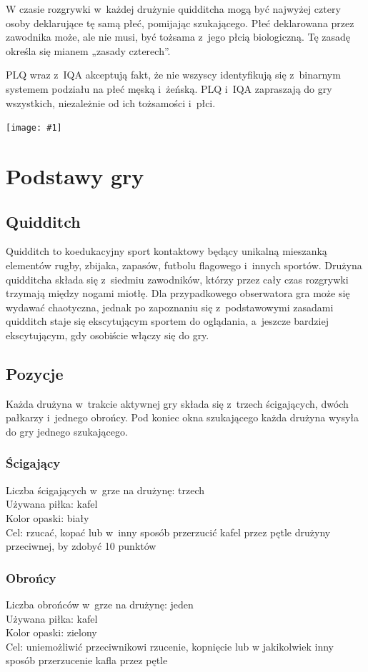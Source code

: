 \documentclass[12pt,a4paper]{article}
\newcommand\image[2]{
	\newgeometry{left=0cm,top=#2}
	\texttt{[image: \#1]}
	\restoregeometry
}
\begin{document}
W czasie rozgrywki w~każdej drużynie quidditcha mogą być najwyżej cztery
osoby deklarujące tę samą płeć, pomijając szukającego. Płeć deklarowana
przez zawodnika może, ale nie musi, być tożsama z~jego płcią
biologiczną. Tę zasadę określa się mianem „zasady czterech''.

PLQ wraz z~IQA akceptują fakt, że nie wszyscy identyfikują się z~binarnym systemem podziału na płeć męską i~żeńską. PLQ i~IQA zapraszają
do gry wszystkich, niezależnie od ich tożsamości i~płci.

\image{team_poland}{6cm}

\pagebreak
\section{Podstawy gry}

\subsection{Quidditch}

Quidditch to koedukacyjny sport kontaktowy będący unikalną mieszanką
elementów rugby, zbijaka, zapasów, futbolu flagowego i~innych sportów.
Drużyna quidditcha składa się z~siedmiu zawodników, którzy przez cały
czas rozgrywki trzymają między nogami miotłę. Dla przypadkowego
obserwatora gra może się wydawać chaotyczna, jednak po zapoznaniu się z~podstawowymi zasadami quidditch staje się ekscytującym sportem do
oglądania, a~jeszcze bardziej ekscytującym, gdy osobiście włączy się do
gry.

\subsection{Pozycje}
Każda drużyna w~trakcie aktywnej gry składa się z~trzech ścigających,
dwóch pałkarzy i~jednego obrońcy. Pod koniec okna szukającego każda
drużyna wysyła do gry jednego szukającego.

\subsubsection{Ścigający}
Liczba ścigających w~grze na drużynę: trzech \\
Używana piłka: kafel \\
Kolor opaski: biały \\
Cel: rzucać, kopać lub w~inny sposób przerzucić kafel przez pętle
drużyny przeciwnej, by zdobyć 10 punktów

\subsubsection{Obrońcy}
Liczba obrońców w~grze na drużynę: jeden \\
Używana piłka: kafel \\
Kolor opaski: zielony \\
Cel: uniemożliwić przeciwnikowi rzucenie, kopnięcie lub w jakikolwiek inny sposób przerzucenie kafla przez pętle
\end{document}
